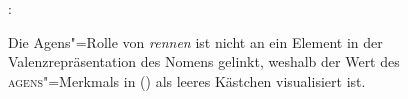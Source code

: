 \eas
\label{le-gerenne}
:\\
\zs

\noindent
Die Agens"=Rolle von \emph{rennen} ist nicht an ein Element in der Valenzrepräsentation
des Nomens gelinkt, weshalb der Wert des \textsc{agens}"=Merkmals in () 
als leeres Kästchen visualisiert ist.


